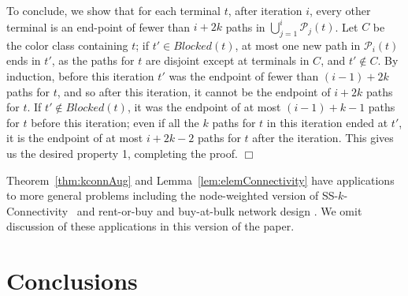\documentclass[11pt]{article}
\newcommand{\sskconn}{{\sc SS-$k$-Connectivity}}
\newenvironment{proofof}[1]{\smallskip\noindent{\bf Proof of #1:}}{\hspace*{\fill}$\Box$\par}
\def\script#1{\mathcal{#1}}
\begin{document}
\begin{proofof}{Theorem~\ref{thm:kconnAug}}
  To conclude, we show that for each terminal $t$, after iteration
  $i$, every other terminal is an end-point of fewer than $i + 2k$
  paths in $\bigcup_{j=1}^i \script{P}_j(t)$. Let $C$ be the color
  class containing $t$; if $t' \in Blocked(t)$, at most one new path
  in $\script{P}_i(t)$ ends in $t'$, as the paths for $t$ are disjoint
  except at terminals in $C$, and $t' \notin C$. By induction, before
  this iteration $t'$ was the endpoint of fewer than $(i-1) + 2k$
  paths for $t$, and so after this iteration, it cannot be the
  endpoint of $i+2k$ paths for $t$. If $t' \notin Blocked(t)$, it was
  the endpoint of at most $(i-1)+k-1$ paths for $t$ before this
  iteration; even if all the $k$ paths for $t$ in this iteration ended
  at $t'$, it is the endpoint of at most $i+2k-2$ paths for $t$ after
  the iteration. This gives us the desired property 1, completing the
  proof.
\end{proofof}

Theorem~\ref{thm:kconnAug} and Lemma~\ref{lem:elemConnectivity} have
applications to more general problems including the node-weighted
version of \sskconn\ \cite{ChuzhoyK08} and rent-or-buy and buy-at-bulk
network design \cite{ChekuriK08}. We omit discussion of these
applications in this version of the paper.

\section{Conclusions}
\end{document}
